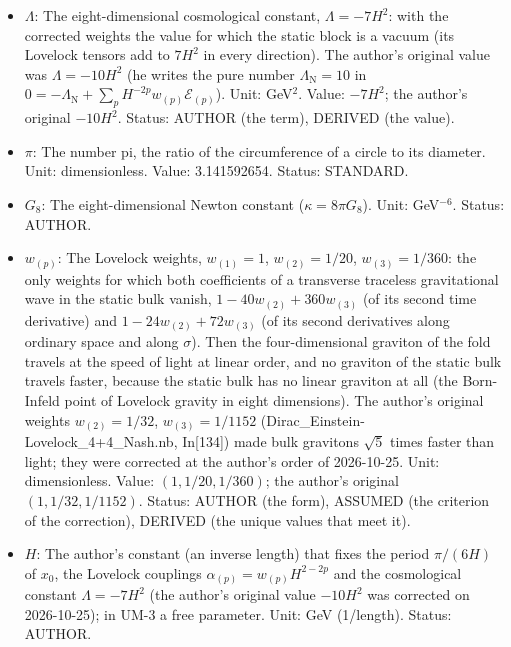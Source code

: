 \documentclass[
  10pt,
]{article}
\begin{document}
\begin{itemize}
  \(\mathcal{L}_{(3)}\) the cubic Lovelock density. Unit:
  1/length\(^{2p}\). Status: STANDARD.
\item
  \(\Lambda\): The eight-dimensional cosmological constant,
  \(\Lambda = -7H^2\): with the corrected weights the value for which
  the static block is a vacuum (its Lovelock tensors add to \(7H^2\) in
  every direction). The author's original value was \(\Lambda = -10H^2\)
  (he writes the pure number \(\Lambda_{\mathrm{N}} = 10\) in
  \(0 = -\Lambda_{\mathrm{N}} + \sum_p H^{-2p}w_{(p)}\mathcal{E}_{(p)}\)).
  Unit: GeV\(^2\). Value: \(-7H^2\); the author's original \(-10H^2\).
  Status: AUTHOR (the term), DERIVED (the value).
\item
  \(\pi\): The number pi, the ratio of the circumference of a circle to
  its diameter. Unit: dimensionless. Value: 3.141592654. Status:
  STANDARD.
\item
  \(G_8\): The eight-dimensional Newton constant
  (\(\kappa = 8\pi G_8\)). Unit: GeV\(^{-6}\). Status: AUTHOR.
\item
  \(w_{(p)}\): The Lovelock weights, \(w_{(1)} = 1\),
  \(w_{(2)} = 1/20\), \(w_{(3)} = 1/360\): the only weights for which
  both coefficients of a transverse traceless gravitational wave in the
  static bulk vanish, \(1 - 40w_{(2)} + 360w_{(3)}\) (of its second time
  derivative) and \(1 - 24w_{(2)} + 72w_{(3)}\) (of its second
  derivatives along ordinary space and along \(\sigma\)). Then the
  four-dimensional graviton of the fold travels at the speed of light at
  linear order, and no graviton of the static bulk travels faster,
  because the static bulk has no linear graviton at all (the Born-Infeld
  point of Lovelock gravity in eight dimensions). The author's original
  weights \(w_{(2)} = 1/32\), \(w_{(3)} = 1/1152\)
  (Dirac\_Einstein-Lovelock\_4+4\_Nash.nb, In{[}134{]}) made bulk
  gravitons \(\sqrt5\) times faster than light; they were corrected at
  the author's order of 2026-10-25. Unit: dimensionless. Value:
  \((1, 1/20, 1/360)\); the author's original \((1, 1/32, 1/1152)\).
  Status: AUTHOR (the form), ASSUMED (the criterion of the correction),
  DERIVED (the unique values that meet it).
\item
  \(H\): The author's constant (an inverse length) that fixes the period
  \(\pi/(6H)\) of \(x_0\), the Lovelock couplings
  \(\alpha_{(p)} = w_{(p)}H^{2-2p}\) and the cosmological constant
  \(\Lambda = -7H^2\) (the author's original value \(-10H^2\) was
  corrected on 2026-10-25); in UM-3 a free parameter. Unit: GeV
  (1/length). Status: AUTHOR.
\end{itemize}
\end{document}
